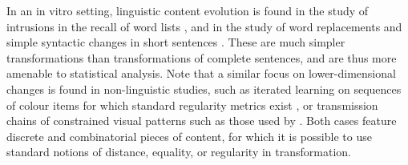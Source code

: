 In an in vitro setting, linguistic content evolution is found in the study of intrusions in the recall of word lists \autocite[see][for a review]{zaromb_temporal_2006}, and in the study of word replacements and simple syntactic changes in short sentences \autocites{potter_regeneration_1990}{lombardi_regeneration_1992}.
These are much simpler transformations than transformations of complete sentences, and are thus more amenable to statistical analysis. Note that a similar focus on lower-dimensional changes is found in non-linguistic studies, such as iterated learning on sequences of colour items for which standard regularity metrics exist \autocite{cornish_systems_2013}, or transmission chains of constrained visual patterns such as those used by \textcite{claidiere_cultural_2014}. Both cases feature discrete and combinatorial pieces of content, for which it is possible to use standard notions of distance, equality, or regularity in transformation. 






